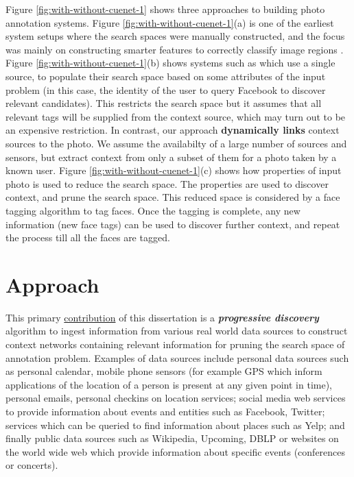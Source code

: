Figure \ref{fig:with-without-cuenet-1} shows three approaches to building photo annotation systems. Figure \ref{fig:with-without-cuenet-1}(a) is one of the earliest system setups where the search spaces were manually constructed, and the focus was mainly on constructing smarter features to correctly classify image regions \cite{belhumeur1997eigenfaces, turk1991eigenfaces}. Figure \ref{fig:with-without-cuenet-1}(b) shows systems such as \cite{stone2008autotagging} which use a single source, to populate their search space based on some attributes of the input problem (in this case, the identity of the user to query Facebook to discover relevant candidates). This restricts the search space but it assumes that all relevant tags will be supplied from the context source, which may turn out to be an expensive restriction. In contrast, our approach \textbf{dynamically links} context sources to the photo. We assume the availabilty of a large number of sources and sensors, but extract context from only a subset of them for a photo taken by a known user. Figure \ref{fig:with-without-cuenet-1}(c) shows how properties of input photo is used to reduce the search space. The properties are used to discover context, and prune the search space. This reduced space is considered by a face tagging algorithm to tag faces. Once the tagging is complete, any new information (new face tags) can be used to discover further context, and repeat the process till all the faces are tagged.

\section{Approach}
This primary \uline{contribution} of this dissertation is a \textbf{\textit{progressive discovery}} algorithm to ingest information from various real world data sources to construct context networks containing relevant information for pruning the search space of annotation problem. Examples of data sources include personal data sources such as personal calendar, mobile phone sensors (for example GPS which inform applications of the location of a person is present at any given point in time), personal emails, personal checkins on location services; social media web services to provide information about events and entities such as Facebook, Twitter; services which can be queried to find information about places such as Yelp; and finally public data sources such as Wikipedia, Upcoming, DBLP or websites on the world wide web which provide information about specific events (conferences or concerts).


